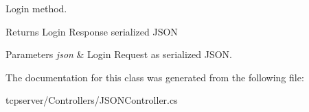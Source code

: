 Login method. 

\begin{DoxyReturn}{Returns}
Login Response serialized J\+S\+O\+N
\end{DoxyReturn}

\begin{DoxyParams}{Parameters}
{\em json} & Login Request as serialized J\+S\+O\+N.\\
\hline
\end{DoxyParams}


The documentation for this class was generated from the following file\+:\begin{DoxyCompactItemize}
\item 
tcpserver/\+Controllers/J\+S\+O\+N\+Controller.\+cs\end{DoxyCompactItemize}
